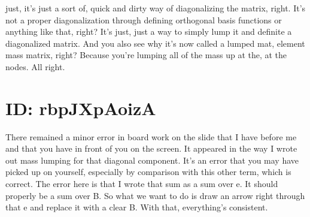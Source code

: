 \documentclass[10pt]{article}
\begin{document}
just, it's just a sort of, quick and dirty way of diagonalizing the matrix, right. It's not a proper diagonalization through defining orthogonal basis functions or anything like that, right? It's just, just a way to simply lump it and definite a diagonalized matrix. And you also see why it's now called a lumped mat, element mass matrix, right? Because you're lumping all of the mass up at the, at the nodes. All right.

\section*{ID: rbpJXpAoizA}
There remained a minor error in board work on the slide that I have before me and that you have in front of you on the screen. It appeared in the way I wrote out mass lumping for that diagonal component. It's an error that you may have picked up on yourself, especially by comparison with this other term, which is correct. The error here is that I wrote that sum as a sum over e. It should properly be a sum over B. So what we want to do is draw an arrow right through that e and replace it with a clear B. With that, everything's consistent.
\end{document}
